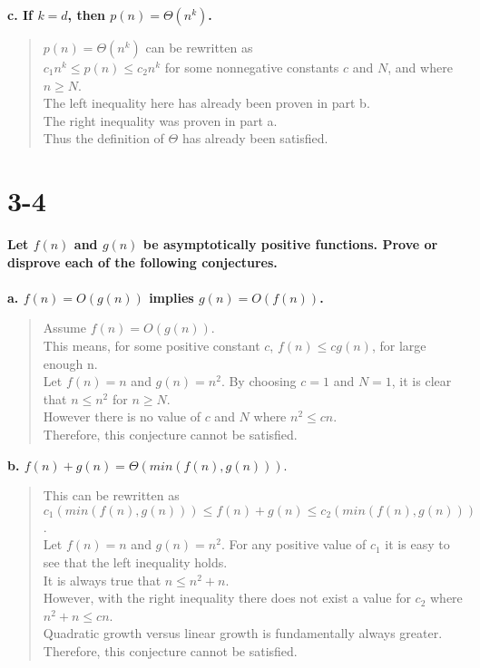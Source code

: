 \documentclass{article}
\begin{document}
\textbf{c. If $k = d$, then $p(n) = \Theta(n^{k})$.\\}
\begin{quote}
\textsf{$p(n) = \Theta(n^{k})$ can be rewritten as\\
$c_{1}n^{k} \leq p(n) \leq c_{2}n^{k}$ for some nonnegative constants $c$ and $N$,
and where $n \geq N$.\\
The left inequality here has already been proven in part b.\\
The right inequality was proven in part a.\\
Thus the definition of $\Theta$ has already been satisfied.\\}
\end{quote}

\pagebreak

\section*{3-4}
\textbf{Let $f(n)$ and $g(n)$ be asymptotically positive functions. Prove or disprove each of the following conjectures.\\\\}
\textbf{a. $f(n) = O(g(n))$ implies $g(n) = O(f(n))$.\\}
\begin{quote}
\textsf{Assume $f(n) = O(g(n))$.\\
This means, for some positive constant $c$, $f(n) \leq cg(n)$, for large enough n.\\
Let $f(n) = n$ and $g(n) = n^{2}$. By choosing $c = 1$ and $N = 1$, it is clear that $n \leq n^{2}$ for $n \geq N$.\\
However there is no value of $c$ and $N$ where $n^{2} \leq cn$.\\
Therefore, this conjecture cannot be satisfied.\\}
\end{quote}

\textbf{b. $f(n) + g(n) = \Theta(min(f(n),g(n))).$\\}
\begin{quote}
\textsf{This can be rewritten as $c_{1}(min(f(n),g(n))) \leq f(n) + g(n) \leq c_{2}(min(f(n),g(n)))$.\\
Let $f(n) = n$ and $g(n) = n^{2}$. For any positive value of $c_{1}$ it is easy to see that the left inequality holds.\\
It is always true that $n \leq n^{2} + n$.\\
However, with the right inequality there does not exist a value for $c_{2}$ where $n^{2} + n \leq cn$.\\
Quadratic growth versus linear growth is fundamentally always greater.\\
Therefore, this conjecture cannot be satisfied.\\}
\end{quote}
\end{document}
